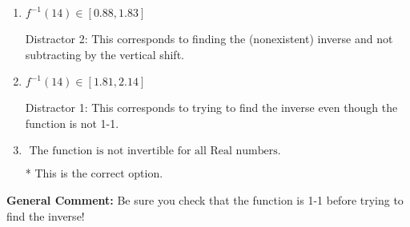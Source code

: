 \documentclass{extbook}[14pt]
\begin{document}
\begin{enumerate}
{\begin{enumerate}[label=\Alph*.]
 Distractor 4: This corresponds to both distractors 2 and 3.
\item \( f^{-1}(14) \in [0.88, 1.83] \)

 Distractor 2: This corresponds to finding the (nonexistent) inverse and not subtracting by the vertical shift.
\item \( f^{-1}(14) \in [1.81, 2.14] \)

 Distractor 1: This corresponds to trying to find the inverse even though the function is not 1-1. 
\item \( \text{ The function is not invertible for all Real numbers. } \)

* This is the correct option.
\end{enumerate}

\textbf{General Comment:} Be sure you check that the function is 1-1 before trying to find the inverse!
}
\end{enumerate}
\end{document}
